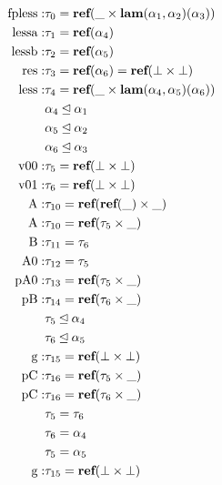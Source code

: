 $$
\begin{aligned}
\text{fpless}:& \tau_{0} = \text{\bf ref}(\_ \times \text{\bf lam}(\alpha_1, \alpha_2)(\alpha_3))\\
\text{lessa} :& \tau_{1} = \text{\bf ref}(\alpha_4) \\
\text{lessb} :& \tau_{2} = \text{\bf ref}(\alpha_5) \\
\text{res}   :& \tau_{3} = \text{\bf ref}(\alpha_6) = \text{\bf ref}(\bot \times \bot) \\
\text{less}  :& \tau_{4} = \text{\bf ref}(\_ \times \text{\bf lam}(\alpha_4, \alpha_5)(\alpha_6)) \\
			  & \alpha_{4} \unlhd \alpha_{1} \\
			  & \alpha_{5} \unlhd \alpha_{2} \\
			  & \alpha_{6} \unlhd \alpha_{3} \\



\text{v00}:   & \tau_{5} = \text{\bf ref}(\bot \times \bot) \\
\text{v01}:   & \tau_{6} = \text{\bf ref}(\bot \times \bot) \\
\text{A}     :& \tau_{10} = \text{\bf ref}(\text{\bf ref}(\_) \times \_) \\
\text{A}     :& \tau_{10} = \text{\bf ref}(\tau_{5} \times \_) \\
\text{B}     :& \tau_{11} = \tau_{6} \\
\text{A0}    :& \tau_{12} = \tau_{5} \\
\text{pA0}   :& \tau_{13} = \text{\bf ref}(\tau_{5} \times \_) \\
\text{pB}    :& \tau_{14} = \text{\bf ref}(\tau_{6} \times \_) \\
			  & \tau_{5} \unlhd \alpha_{4} \\
			  & \tau_{6} \unlhd \alpha_{5} \\
\text{g}     :& \tau_{15} = \text{\bf ref}(\bot \times \bot) \\
\text{pC}    :& \tau_{16} = \text{\bf ref}(\tau_{5} \times \_) \\
\text{pC}    :& \tau_{16} = \text{\bf ref}(\tau_{6} \times \_) \\
			  & \tau_{5} = \tau_{6} \\
			  & \tau_{6} = \alpha_{4} \\
			  & \tau_{5} = \alpha_{5} \\
\text{g}     :& \tau_{15} = \text{\bf ref}(\bot \times \bot)

\end{aligned}
$$

